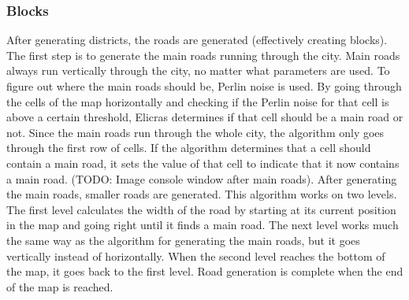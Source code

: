 		\subsubsection{Blocks}
		After generating districts, the roads are generated (effectively creating blocks). The first step is to generate the main roads running through the city. Main roads always run vertically through the city, no matter what parameters are used. To figure out where the main roads should be, Perlin noise is used. By going through the cells of the map horizontally and checking if the Perlin noise for that cell is above a certain threshold, Elicras determines if that cell should be a main road or not. Since the main roads run through the whole city, the algorithm only goes through the first row of cells. If the algorithm determines that a cell should contain a main road, it sets the value of that cell to indicate that it now contains a main road. (TODO: Image console window after main roads). After generating the main roads, smaller roads are generated. This algorithm works on two levels. The first level calculates the width of the road by starting at its current position in the map and going right until it finds a main road. The next level works much the same way as the algorithm for generating the main roads, but it goes vertically instead of horizontally. When the second level reaches the bottom of the map, it goes back to the first level. Road generation is complete when the end of the map is reached.
		
